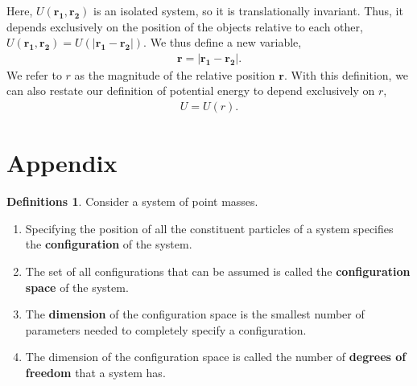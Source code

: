 \documentclass[10.5pt, psamsfonts]{amsart}
\theoremstyle{definition}
\newtheorem{defns}[thm]{Definitions}
\theoremstyle{remark}
\numberwithin{equation}{section}
\begin{document}
Here, $U(\bm{r_1}, \bm{r_2})$ is an isolated system, so it is translationally invariant. Thus, it depends exclusively on the position of the objects relative to each other, $U(\bm{r_1}, \bm{r_2}) = U(|\bm{r_1} - \bm{r_2}|) $. We thus define a new variable,
\begin{align*}
  \bm{r} = |\bm{r_1} - \bm{r_2}|.
\end{align*}
We refer to $r$ as the magnitude of the relative position $\bm{r}$. With this definition, we can also restate our definition of potential energy to depend exclusively on $r$,
\begin{align*}
  U = U(r).
\end{align*}

\newpage
\section*{Appendix}
\appendix
\begin{defns}
  Consider a system of point masses. 
  \begin{enumerate}
    \item Specifying the position of all the constituent particles of a system specifies the \textbf{configuration} of the system.
    \item The set of all configurations that can be assumed is called the \textbf{configuration space} of the system.
    \item The \textbf{dimension} of the configuration space is the smallest number of parameters needed to completely specify a configuration.
    \item The dimension of the configuration space is called the number of \textbf{degrees of freedom} that a system has.
  \end{enumerate}
\end{defns}
\end{document}
